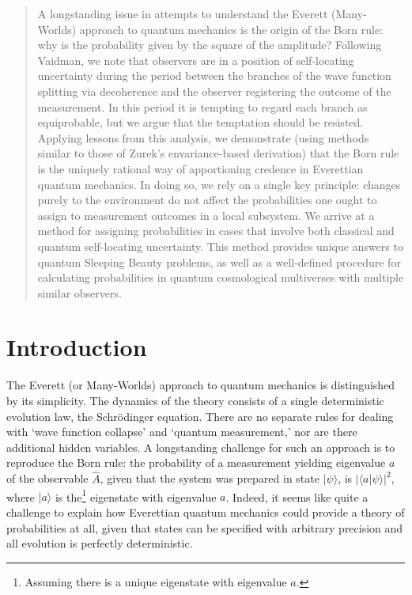 \documentclass[12pt,onecolumn,secnumarabic,amsmath,amssymb,balancelastpage,nofootinbib]{article}
\begin{document}
\maketitle
\begin{abstract}
A longstanding issue in attempts to understand the Everett (Many-Worlds) approach to quantum mechanics is the origin of the Born rule: why is the probability given by the square of the amplitude? Following Vaidman, we note that observers are in a position of self-locating uncertainty during the period between the branches of the wave function splitting via decoherence and the observer registering the outcome of the measurement. In this period it is tempting to regard each branch as equiprobable, but we argue that the temptation should be resisted.  Applying lessons from this analysis, we demonstrate (using methods similar to those of Zurek's envariance-based derivation) that the Born rule is the uniquely rational way of apportioning credence in Everettian quantum mechanics.  In doing so, we rely on a single key principle: changes purely to the environment do not affect the probabilities one ought to assign to measurement outcomes in a local subsystem.  We arrive at a method for assigning probabilities in cases that involve both classical and quantum self-locating uncertainty. This method provides unique answers to quantum Sleeping Beauty problems, as well as a well-defined procedure for calculating probabilities in quantum cosmological multiverses with multiple similar observers.
\end{abstract}
\newpage

\tableofcontents

\newpage

\section{Introduction}

The Everett (or Many-Worlds) approach to quantum mechanics is distinguished by its simplicity. The dynamics of the theory consists of a single deterministic evolution law, the Schr\"odinger equation.   There are no separate rules for dealing with `wave function collapse' and `quantum measurement,' nor are there additional hidden variables. A longstanding challenge for such an approach is to reproduce the Born rule: the probability of a measurement yielding eigenvalue $a$ of the observable $\widehat{A}$, given that the system was prepared in state $|\psi\rangle$, is $|\langle a|\psi\rangle|^2$, where $|a\rangle$ is the\footnote{Assuming there is a unique eigenstate with eigenvalue $a$.} eigenstate with eigenvalue $a$. Indeed, it seems like quite a challenge to explain how Everettian quantum mechanics could provide a theory of probabilities at all, given that states can be specified with arbitrary precision and all evolution is perfectly deterministic.
\end{document}
